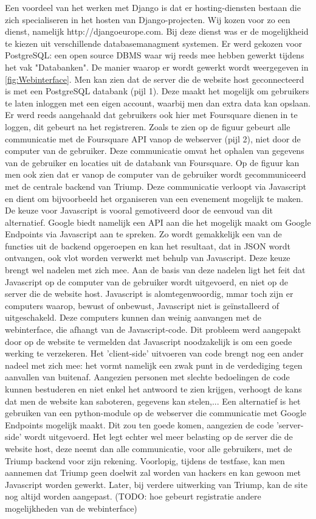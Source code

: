 Een voordeel van het werken met Django is dat er hosting-diensten bestaan die zich specialiseren in het hosten van Django-projecten. Wij kozen voor zo een dienst, namelijk http://djangoeurope.com.
Bij deze dienst was er de mogelijkheid te kiezen uit verschillende databasemanagment systemen. Er werd gekozen voor PostgreSQL: een open source DBMS waar wij reeds mee hebben gewerkt tijdens het vak "Databanken".
De manier waarop er wordt gewerkt wordt weergegeven in \ref{fig:Webinterface}. Men kan zien dat de server die de website host geconnecteerd is met een PostgreSQL databank (pijl 1). Deze maakt het mogelijk om gebruikers te laten inloggen met een eigen account, waarbij men dan extra data kan opslaan. Er werd reeds aangehaald dat gebruikers ook hier met Foursquare dienen in te loggen, dit gebeurt na het registreren. Zoals te zien op de figuur gebeurt alle communicatie met de Foursquare API vanop de webserver (pijl 2), niet door de computer van de gebruiker. Deze communicatie omvat het ophalen van gegevens van de gebruiker en locaties uit de databank van Foursquare.
Op de figuur kan men ook zien dat er vanop de computer van de gebruiker wordt gecommuniceerd met de centrale backend van Triump.
Deze communicatie verloopt via Javascript en dient om bijvoorbeeld het organiseren van een evenement mogelijk te maken.
De keuze voor Javascript is vooral gemotiveerd door de eenvoud van dit alternatief. Google biedt namelijk een API aan die het mogelijk maakt om Google Endpoints via Javascript aan te spreken.
Zo wordt gemakkelijk een van de functies uit de backend opgeroepen en kan het resultaat, dat in JSON wordt ontvangen, ook vlot worden verwerkt met behulp van Javascript.
Deze keuze brengt wel nadelen met zich mee. Aan de basis van deze nadelen ligt het feit dat Javascript op de computer van de gebruiker wordt uitgevoerd, en niet op de server die de website host. 
Javascript is alomtegenwoordig, mmar toch zijn er computers waarop, bewust of onbewust, Javascript niet is geïnstalleerd of uitgeschakeld. 
Deze computers kunnen dan weinig aanvangen met de webinterface, die afhangt van de Javascript-code. Dit probleem werd aangepakt door op de website te vermelden dat Javascript noodzakelijk is om een goede werking te verzekeren.
Het 'client-side' uitvoeren van code brengt nog een ander nadeel met zich mee: het vormt namelijk een zwak punt in de verdediging tegen aanvallen van buitenaf.
Aangezien personen met slechte bedoelingen de code kunnen bestuderen en niet enkel het antwoord te zien krijgen, verhoogt de kans dat men de website kan saboteren, gegevens kan stelen,...
Een alternatief is het gebruiken van een python-module op de webserver die communicatie met Google Endpoints mogelijk maakt. Dit zou ten goede komen, aangezien de code 'server-side' wordt uitgevoerd.
Het legt echter wel meer belasting op de server die de website host, deze neemt dan alle communicatie, voor alle gebruikers, met de Triump backend voor zijn rekening.
Voorlopig, tijdens de testfase, kan men aannemen dat Triump geen doelwit zal worden van hackers en kan gewoon met Javascript worden gewerkt. Later, bij verdere uitwerking van Triump, kan de site nog altijd worden aangepast.
(TODO: hoe gebeurt registratie
	   andere mogelijkheden van de webinterface) 

